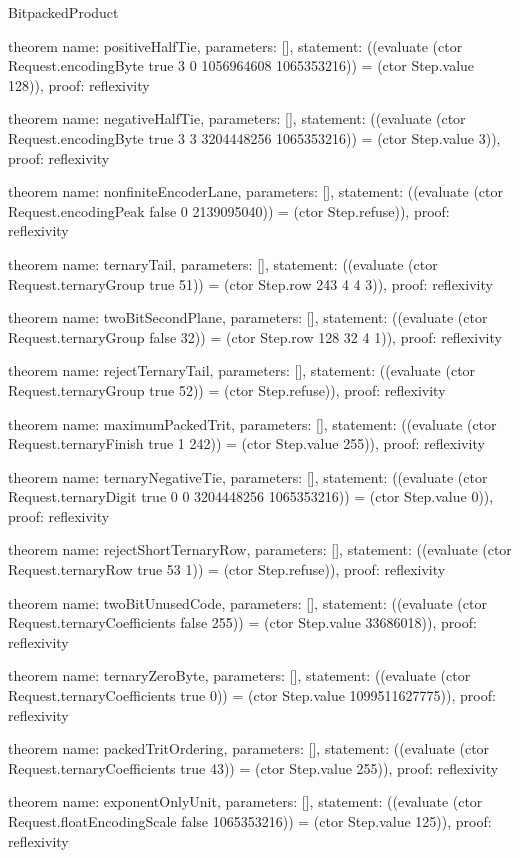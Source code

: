 \begin{lexlean}{BitpackedProduct}
\begin{semanticmodule}
theorem{
  name: positiveHalfTie,
  parameters: [],
  statement: ((evaluate (ctor Request.encodingByte true 3 0 1056964608 1065353216)) = (ctor Step.value 128)),
  proof: reflexivity{}
}

theorem{
  name: negativeHalfTie,
  parameters: [],
  statement: ((evaluate (ctor Request.encodingByte true 3 3 3204448256 1065353216)) = (ctor Step.value 3)),
  proof: reflexivity{}
}

theorem{
  name: nonfiniteEncoderLane,
  parameters: [],
  statement: ((evaluate (ctor Request.encodingPeak false 0 2139095040)) = (ctor Step.refuse)),
  proof: reflexivity{}
}

theorem{
  name: ternaryTail,
  parameters: [],
  statement: ((evaluate (ctor Request.ternaryGroup true 51)) = (ctor Step.row 243 4 4 3)),
  proof: reflexivity{}
}

theorem{
  name: twoBitSecondPlane,
  parameters: [],
  statement: ((evaluate (ctor Request.ternaryGroup false 32)) = (ctor Step.row 128 32 4 1)),
  proof: reflexivity{}
}

theorem{
  name: rejectTernaryTail,
  parameters: [],
  statement: ((evaluate (ctor Request.ternaryGroup true 52)) = (ctor Step.refuse)),
  proof: reflexivity{}
}

theorem{
  name: maximumPackedTrit,
  parameters: [],
  statement: ((evaluate (ctor Request.ternaryFinish true 1 242)) = (ctor Step.value 255)),
  proof: reflexivity{}
}

theorem{
  name: ternaryNegativeTie,
  parameters: [],
  statement: ((evaluate (ctor Request.ternaryDigit true 0 0 3204448256 1065353216)) = (ctor Step.value 0)),
  proof: reflexivity{}
}

theorem{
  name: rejectShortTernaryRow,
  parameters: [],
  statement: ((evaluate (ctor Request.ternaryRow true 53 1)) = (ctor Step.refuse)),
  proof: reflexivity{}
}

theorem{
  name: twoBitUnusedCode,
  parameters: [],
  statement: ((evaluate (ctor Request.ternaryCoefficients false 255)) = (ctor Step.value 33686018)),
  proof: reflexivity{}
}

theorem{
  name: ternaryZeroByte,
  parameters: [],
  statement: ((evaluate (ctor Request.ternaryCoefficients true 0)) = (ctor Step.value 1099511627775)),
  proof: reflexivity{}
}

theorem{
  name: packedTritOrdering,
  parameters: [],
  statement: ((evaluate (ctor Request.ternaryCoefficients true 43)) = (ctor Step.value 255)),
  proof: reflexivity{}
}

theorem{
  name: exponentOnlyUnit,
  parameters: [],
  statement: ((evaluate (ctor Request.floatEncodingScale false 1065353216)) = (ctor Step.value 125)),
  proof: reflexivity{}
}


\end{semanticmodule}
\end{lexlean}
